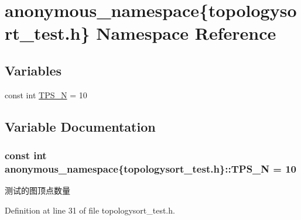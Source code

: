 \hypertarget{namespaceanonymous__namespace_02topologysort__test_8h_03}{}\section{anonymous\+\_\+namespace\{topologysort\+\_\+test.\+h\} Namespace Reference}
\label{namespaceanonymous__namespace_02topologysort__test_8h_03}
\subsection*{Variables}
\begin{DoxyCompactItemize}
\item 
const int \hyperlink{namespaceanonymous__namespace_02topologysort__test_8h_03_a2fd3a3f56c40d84a7330ad41b2620485}{T\+P\+S\+\_\+\+N} = 10
\end{DoxyCompactItemize}


\subsection{Variable Documentation}
\hypertarget{namespaceanonymous__namespace_02topologysort__test_8h_03_a2fd3a3f56c40d84a7330ad41b2620485}{}
\subsubsection[{T\+P\+S\+\_\+\+N}]{\setlength{\rightskip}{0pt plus 5cm}const int anonymous\+\_\+namespace\{topologysort\+\_\+test.\+h\}\+::T\+P\+S\+\_\+\+N = 10}\label{namespaceanonymous__namespace_02topologysort__test_8h_03_a2fd3a3f56c40d84a7330ad41b2620485}
测试的图顶点数量 

Definition at line 31 of file topologysort\+\_\+test.\+h.

